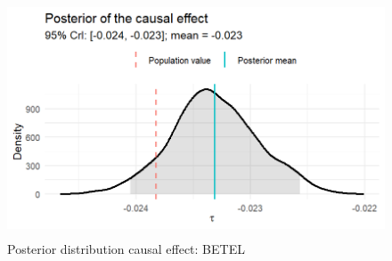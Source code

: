 \begin{enumerate}[leftmargin=*]
\begin{figure}[h!]
	\includegraphics[width=340pt, height=200pt]{Chapters/chapter12/figures/fig12_SimCausality.png}
	\caption[List of figure caption goes here]{Posterior distribution causal effect: BETEL}\label{fig12_Causal}
\end{figure}

\end{enumerate}